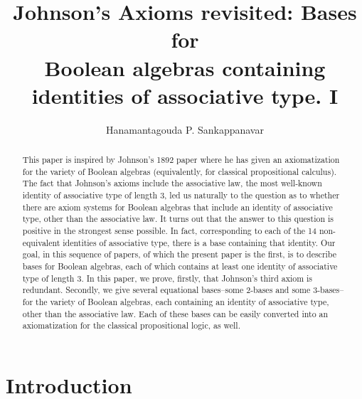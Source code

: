 \documentclass{amsart}
\theoremstyle{plain}
\theoremstyle{problem}
\theoremstyle{definition}
\theoremstyle{remark}
\numberwithin{equation}{section}
\begin{document}
\title[Bases for Boolean algebras] {Johnson's Axioms revisited:  Bases for \\Boolean algebras %
containing identities of associative type. I}
\author{Hanamantagouda P. Sankappanavar}
\address{Department of Mathematics\\
         State University of New York\\
         New Paltz, New York 12561}

\begin{abstract}
This paper is inspired by Johnson's 1892 paper 
where he has given an axiomatization for the variety of Boolean algebras (equivalently, for classical propositional calculus).  The fact that Johnson's axioms include the associative law, the most well-known identity of associative type of length 3, led us naturally to  the question as to whether there are axiom systems for Boolean algebras that include an identity of associative type, other than the associative law.  It turns out that the answer to this question is positive in the strongest sense possible.  In fact, corresponding to each of the 14 non-equivalent identities of associative type, there is a base containing that identity.
Our goal, in this sequence of papers, of which the present paper is the first, is to describe 
 bases for Boolean algebras, 
each of which contains at least one identity of associative type of length 3.
In this paper, we prove, firstly, that Johnson's third axiom is redundant.  Secondly, %
we give several equational bases--some 2-bases and some 3-bases--for the variety of Boolean algebras, each containing an identity of associative type, other than the associative law.   Each of these bases can be easily converted into an axiomatization for the classical propositional logic, as well.    
\end{abstract}

\maketitle


\section{Introduction}
\end{document}
